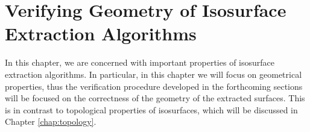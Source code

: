 \chapter{Verifying Geometry of Isosurface Extraction Algorithms}
\label{chap:geometry}

In this chapter, we are concerned with important properties of isosurface extraction algorithms. 
In particular, in this chapter we will focus on geometrical properties, thus the verification
procedure developed in the forthcoming sections will be focused on the correctness of the geometry of the extracted surfaces. This is in contrast to topological properties of isosurfaces, which will be discussed in
Chapter \ref{chap:topology}. 


%

%

%

%

%

%
